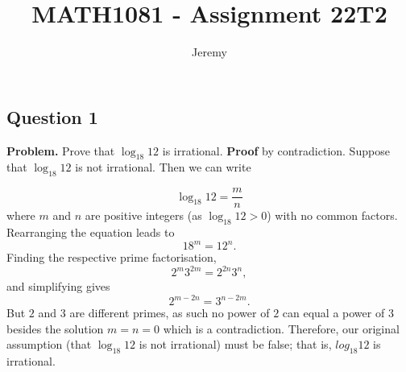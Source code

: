 \usepackage[utf8]{inputenc}
\usepackage{amsmath}

\title{MATH1081 - Assignment 22T2}
\author{Jeremy}



\maketitle

\subsection*{Question 1}
\textbf{Problem.} Prove that $\log_{18} 12$ is irrational.
\newline
\textbf{Proof} by contradiction. Suppose that $\log_{18} 12$ is not irrational. Then we can write

\begin{equation*}
\log_{18} 12 = \frac{m}{n}
\end{equation*}
where $m$ and $n$ are positive integers (as $\log_{18} 12 > 0$) with no common factors. Rearranging the equation leads to 
\begin{equation*}
18^m = 12^n.
\end{equation*}
Finding the respective prime factorisation,
\begin{equation*}
    2^m 3^{2m} = 2^{2n} 3^n,
\end{equation*}
and simplifying gives
\begin{equation*}
    2^{m-2n} = 3^{n-2m}.
\end{equation*}
But $2$ and $3$ are different primes, as such no power of $2$ can equal a power of $3$ besides the solution $m = n = 0$ which is a contradiction. Therefore, our original assumption (that $\log_{18} 12$ is not irrational) must be false; that is, $log_{18} 12$ is irrational. 




